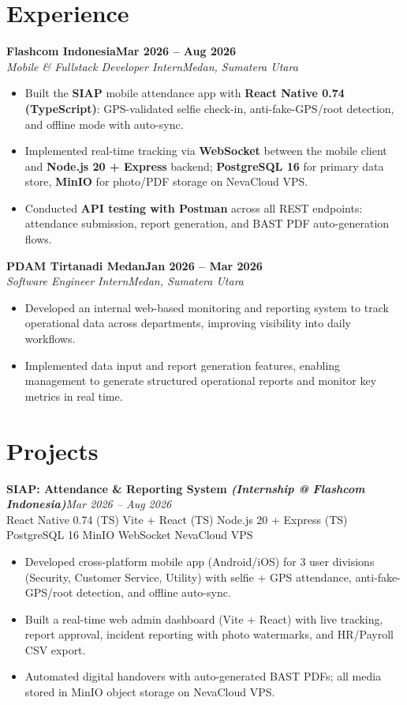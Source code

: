 \documentclass[9.5pt,a4paper]{article}
\newcommand{\cvheading}[4]{%
  {\textbf{#1}\hfill\textbf{#2}\\
  \textit{\color{accentgray}#3}\hfill\textit{\color{accentgray}#4}}
}
\newcommand{\cvproject}[3]{%
  {\textbf{#1}\hfill\textit{\color{accentgray}#2}\\
  \footnotesize\color{accentgray}#3}
}
\begin{document}
\section{Experience}

\cvheading{Flashcom Indonesia}{Mar 2026 -- Aug 2026}{Mobile \& Fullstack Developer Intern}{Medan, Sumatera Utara}
\begin{itemize}
  \item Built the \textbf{SIAP} mobile attendance app with \textbf{React Native 0.74 (TypeScript)}: GPS-validated selfie check-in, anti-fake-GPS/root detection, and offline mode with auto-sync.
  \item Implemented real-time tracking via \textbf{WebSocket} between the mobile client and \textbf{Node.js 20 + Express} backend; \textbf{PostgreSQL 16} for primary data store, \textbf{MinIO} for photo/PDF storage on NevaCloud VPS.
  \item Conducted \textbf{API testing with Postman} across all REST endpoints: attendance submission, report generation, and BAST PDF auto-generation flows.
\end{itemize}

\vspace{3pt}

\cvheading{PDAM Tirtanadi Medan}{Jan 2026 -- Mar 2026}{Software Engineer Intern}{Medan, Sumatera Utara}
\begin{itemize}
  \item Developed an internal web-based monitoring and reporting system to track operational data across departments, improving visibility into daily workflows.
  \item Implemented data input and report generation features, enabling management to generate structured operational reports and monitor key metrics in real time.
\end{itemize}

\section{Projects}

\cvproject{SIAP: Attendance \& Reporting System \normalfont\textit{(Internship @ Flashcom Indonesia)}}{Mar 2026 -- Aug 2026}{React Native 0.74 (TS) \textbullet{} Vite + React (TS) \textbullet{} Node.js 20 + Express (TS) \textbullet{} PostgreSQL 16 \textbullet{} MinIO \textbullet{} WebSocket \textbullet{} NevaCloud VPS}
\begin{itemize}
  \item Developed cross-platform mobile app (Android/iOS) for 3 user divisions (Security, Customer Service, Utility) with selfie + GPS attendance, anti-fake-GPS/root detection, and offline auto-sync.
  \item Built a real-time web admin dashboard (Vite + React) with live tracking, report approval, incident reporting with photo watermarks, and HR/Payroll CSV export.
  \item Automated digital handovers with auto-generated BAST PDFs; all media stored in MinIO object storage on NevaCloud VPS.
\end{itemize}
\end{document}
